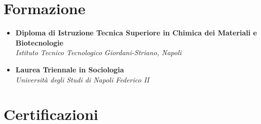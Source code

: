 \documentclass[a4paper,12pt]{article}
\begin{document}
\section{Formazione}
\begin{itemize}[leftmargin=*]
    \item \textbf{Diploma di Istruzione Tecnica Superiore in Chimica dei Materiali e Biotecnologie}\\
    \textit{Istituto Tecnico Tecnologico Giordani-Striano, Napoli}
    \item \textbf{Laurea Triennale in Sociologia}\\
    \textit{Università degli Studi di Napoli Federico II}
\end{itemize}

\section{Certificazioni}
\end{document}
